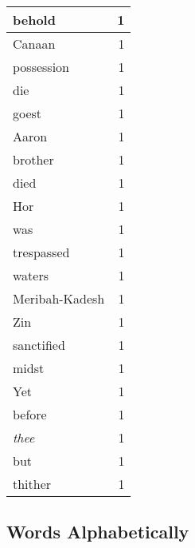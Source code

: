 \begin{center}
\begin{longtable}{l|r}
behold & 1 \\ \hline
Canaan & 1 \\ \hline
possession & 1 \\ \hline
die & 1 \\ \hline
goest & 1 \\ \hline
Aaron & 1 \\ \hline
brother & 1 \\ \hline
died & 1 \\ \hline
Hor & 1 \\ \hline
was & 1 \\ \hline
trespassed & 1 \\ \hline
waters & 1 \\ \hline
Meribah-Kadesh & 1 \\ \hline
Zin & 1 \\ \hline
sanctified & 1 \\ \hline
midst & 1 \\ \hline
Yet & 1 \\ \hline
before & 1 \\ \hline
\emph{thee} & 1 \\ \hline
but & 1 \\ \hline
thither & 1 \\ \hline
\end{longtable}
\end{center}



\normalsize



\subsection{Words Alphabetically}

